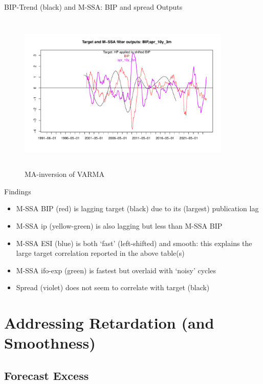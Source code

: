 \documentclass{beamer}
\begin{document}
\begin{frame} {BIP-Trend (black) and M-SSA: BIP and spread Outputs}\label{spr_mssa_o}
\begin{figure}[H]\begin{center}\includegraphics[height=3in, width=4in]{M_SSA_output_4.pdf}\caption{MA-inversion of VARMA\label{cor}}\end{center}\end{figure}\end{frame}


\begin{frame} {Findings}
\begin{itemize}
\item M-SSA BIP (red) is lagging target (black) due to its (largest) publication lag
\item M-SSA ip (yellow-green) is also lagging but less than M-SSA BIP
\item M-SSA ESI (blue) is both `fast' (left-shifted) and smooth: this explains the large target correlation reported in the above table(s)
\item M-SSA ifo-exp (green) is fastest but overlaid with `noisy' cycles
\item Spread (violet) does not seem to correlate with target (black) 
\end{itemize}
\end{frame}






\section{Addressing Retardation (and Smoothness)}


\frame{\sectionpage}

\subsection{Forecast Excess}
\end{document}
